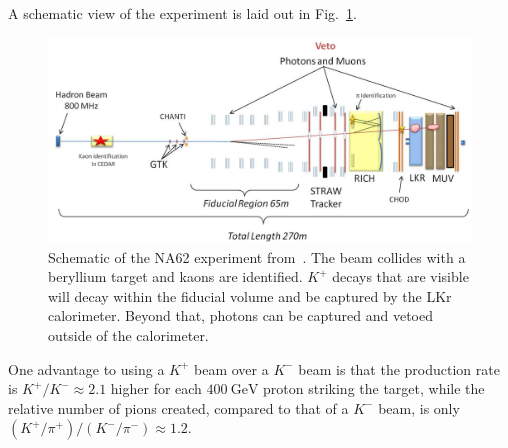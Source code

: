 A schematic view of the experiment is laid out in Fig.~\ref{fig:na62_experiment}.

\begin{figure}[h]
    \centering
    \includegraphics[width=\textwidth]{Figures/experiments/na62_schematic}
    \caption[Schematic of the NA62 experiment.]{Schematic of the NA62 experiment from~\cite{Martellotti:2015kna}. The beam collides with a beryllium target and kaons are identified. $K^+$ decays that are visible will decay within the fiducial volume and be captured by the LKr calorimeter. Beyond that, photons can be captured and vetoed outside of the calorimeter.}
    \label{fig:na62_experiment}
\end{figure}

One advantage to using a $K^+$ beam over a $K^-$ beam is that the production rate is $K^+ / K^- \approx 2.1$ higher for each $400~\textrm{GeV}$ proton striking the target, while the relative number of pions created, compared to that of a $K^-$ beam, is only $(K^+ / \pi^+) / (K^- / \pi^-) \approx 1.2$.
